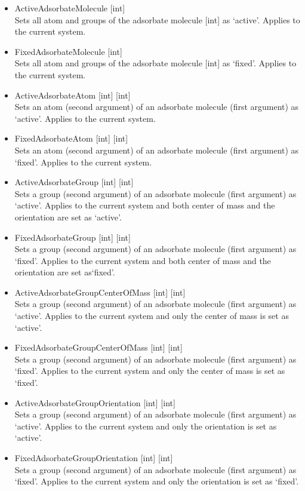 \begin{itemize}
\item{ActiveAdsorbateMolecule [int]}\\
Sets all atom and groups of the adsorbate molecule [int] as `active'. Applies to the current system.
\item{FixedAdsorbateMolecule [int]}\\
Sets all atom and groups of the adsorbate molecule [int] as `fixed'. Applies to the current system.
\item{ActiveAdsorbateAtom [int] [int]}\\
Sets an atom (second argument) of an adsorbate molecule (first argument) as `active'. Applies to the current system.
\item{FixedAdsorbateAtom [int] [int]}\\
Sets an atom (second argument) of an adsorbate molecule (first argument) as `fixed'. Applies to the current system.
\item{ActiveAdsorbateGroup [int] [int]}\\
Sets a group (second argument) of an adsorbate molecule (first argument) as `active'. Applies to the current system
and both center of mass and the orientation are set as `active'.
\item{FixedAdsorbateGroup [int] [int]}\\
Sets a group (second argument) of an adsorbate molecule (first argument) as `fixed'. Applies to the current system
and both center of mass and the orientation are set as`fixed'.
\item{ActiveAdsorbateGroupCenterOfMass [int] [int]}\\
Sets a group (second argument) of an adsorbate molecule (first argument) as `active'. Applies to the current system
and only the center of mass is set as `active'.
\item{FixedAdsorbateGroupCenterOfMass [int] [int]}\\
Sets a group (second argument) of an adsorbate molecule (first argument) as `fixed'. Applies to the current system
and only the center of mass is set as `fixed'.
\item{ActiveAdsorbateGroupOrientation [int] [int]}\\
Sets a group (second argument) of an adsorbate molecule (first argument) as `active'. Applies to the current system
and only the orientation is set as `active'.
\item{FixedAdsorbateGroupOrientation [int] [int]}\\
Sets a group (second argument) of an adsorbate molecule (first argument) as `fixed'. Applies to the current system
and only the orientation is set as `fixed'.


\end{itemize}
